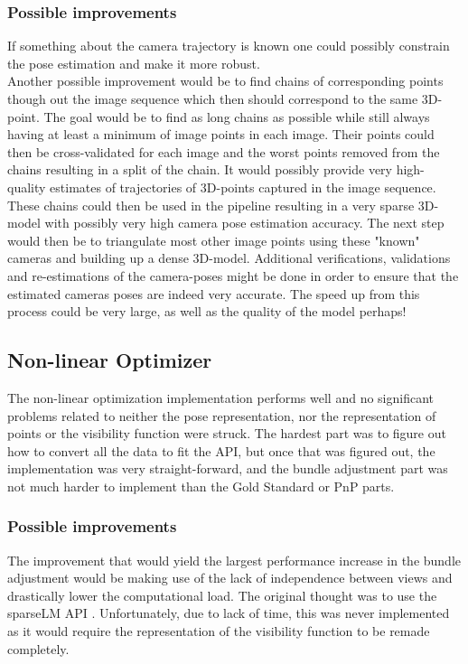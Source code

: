 \subsubsection{Possible improvements}
If something about the camera trajectory is known one could possibly constrain the pose estimation and make it more robust. \\
Another possible improvement would be to find chains of corresponding points though out the image sequence which then should correspond to the same 3D-point. 
The goal would be to find as long chains as possible while still always having at least a minimum of image points in each image. Their points could then be cross-validated for each image and the worst points removed from the chains resulting in a split of the chain. It would possibly provide very high-quality estimates of trajectories of 3D-points captured in the image sequence. These chains could then be used in the pipeline resulting in a very sparse 3D-model with possibly very high camera pose estimation accuracy. The next step would then be to triangulate most other image points using these "known" cameras and building up a dense 3D-model. Additional verifications, validations and re-estimations of the camera-poses might be done in order to ensure that the estimated cameras poses are indeed very accurate. The speed up from this process could be very large, as well as the quality of the model perhaps!

\newpage

\subsection{Non-linear Optimizer}
The non-linear optimization implementation performs well and no significant problems related to neither the pose representation, nor the representation of points or the visibility function were struck. The hardest part was to figure out how to convert all the data to fit the API, but once that was figured out, the implementation was very straight-forward, and the bundle adjustment part was not much harder to implement than the Gold Standard or PnP parts.

\subsubsection{Possible improvements}
The improvement that would yield the largest performance increase in the bundle adjustment would be making use of the lack of independence between views and drastically lower the computational load. The original thought was to use the sparseLM API \cite{sparseLM}. Unfortunately, due to lack of time, this was never implemented as it would require the representation of the visibility function to be remade completely. 

